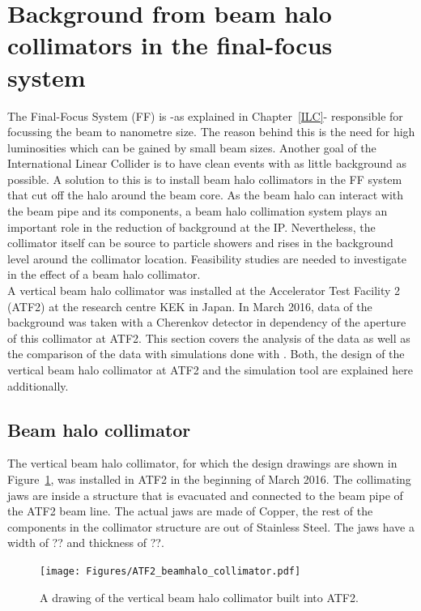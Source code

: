 \section{Background from beam halo collimators in the final-focus system}

The Final-Focus System (FF) is -as explained in Chapter~\ref{ILC}- responsible for focussing the beam to nanometre size. The reason behind this is the need for high luminosities which can be gained by small beam sizes. Another goal of the International Linear Collider is to have clean events with as little background as possible. A solution to this is to install beam halo collimators in the FF system that cut off the halo around the beam core. As the beam halo can interact with the beam pipe and its components, a beam halo collimation system plays an important role in the reduction of background at the IP. Nevertheless, the collimator itself can be source to particle showers and rises in the background level around the collimator location. Feasibility studies are needed to investigate in the effect of a beam halo collimator.\\
A vertical beam halo collimator was installed at the Accelerator Test Facility 2 (ATF2) at the research centre KEK in Japan. In March 2016, data of the background was taken with a Cherenkov detector in dependency of the aperture of this collimator at ATF2. This section covers the analysis of the data as well as the comparison of the data with simulations done with \bdsim. Both, the design of the vertical beam halo collimator at ATF2 and the \geant simulation tool \bdsim are explained here additionally.

\subsection{Beam halo collimator}
\label{Collimator}

The vertical beam halo collimator, for which the design drawings are shown in Figure~\ref{fig:collimator}, was installed in ATF2 in the beginning of March 2016. The collimating jaws are inside a structure that is evacuated and connected to the beam pipe of the ATF2 beam line. The actual jaws are made of Copper, the rest of the components in the collimator structure are out of Stainless Steel. The jaws have a width of ?? and thickness of ??.

\begin{figure}
\centering
\texttt{[image: Figures/ATF2\_beamhalo\_collimator.pdf]}
\caption[Drawing of the beam halo collimator]{A drawing of the vertical beam halo collimator built into ATF2.\cite{NuriaCollimator2015}}
\label{fig:collimator}
\end{figure}


